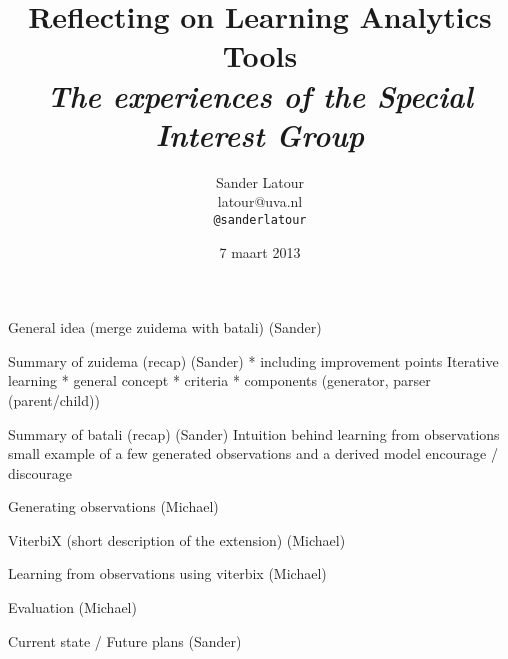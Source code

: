 \documentclass[11pt,a4paper,xcolor=dvipsnames]{beamer}
\author[Sander Latour]{Sander Latour\\\small{latour@uva.nl}\\\small{\texttt{@sanderlatour}}}
\institute{Universiteit van Amsterdam}
\title[Reflecting on Learning Analytics Tools]{\textbf{Reflecting on Learning Analytics Tools}\\\textit{The experiences of the Special Interest Group}}
\date{7 maart 2013}
\begin{document}
\begin{frame}
\titlepage
\end{frame}

\begin{frame}
\tableofcontents
\end{frame}

\begin{frame}
  General idea (merge zuidema with batali) (Sander)
\end{frame}

\begin{frame}
  Summary of zuidema (recap) (Sander)
  * including improvement points
  Iterative learning
  * general concept
  * criteria
  * components (generator, parser (parent/child))
\end{frame}

\begin{frame}
  Summary of batali (recap) (Sander)
Intuition behind learning from observations
small example of a few generated observations and a derived model
  encourage / discourage
\end{frame}

\begin{frame}
  Generating observations (Michael)
\end{frame}

\begin{frame}
  ViterbiX (short description of the extension) (Michael)
\end{frame}

\begin{frame}
  Learning from observations using viterbix (Michael)
\end{frame}

\begin{frame}
  Evaluation (Michael)
\end{frame}

\begin{frame}
  Current state / Future plans (Sander)
\end{frame}
\end{document}
